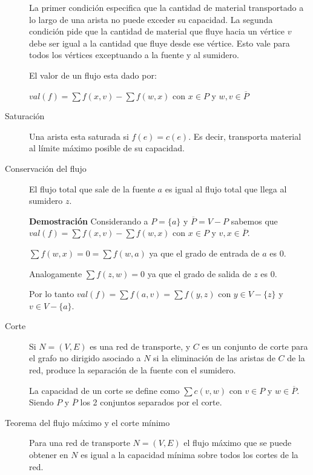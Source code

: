 \documentclass[a4paper, twoside]{article}
\begin{document}
\begin{description}
        La primer condición especifica que la cantidad de material transportado
        a lo largo de una arista no puede exceder su capacidad. La segunda condición
        pide que la cantidad de material que fluye hacia un vértice $v$ debe ser igual
        a la cantidad que fluye desde ese vértice. Esto vale para todos los vértices
        exceptuando a la fuente y al sumidero.

        El valor de un flujo esta dado por:

        $val(f) = \sum f(x,v) - \sum f(w,x)$ con $x \in P$ y $w,v \in \overline{P}$

        \item[Saturación] Una arista esta saturada si $f(e) = c(e)$. Es decir, 
        transporta material al límite máximo posible de su capacidad.

        \item[Conservación del flujo] El flujo total que sale de la fuente $a$ es
        igual al flujo total que llega al sumidero $z$.

        \textbf{Demostración} Considerando a $P = \{a\}$ y $\overline{P} = V - P$
        sabemos que $val(f) = \sum f(x,v) - \sum f(w,x)$ con $x \in P$ y $v,x \in \overline{P}$.
        
        $ \sum f(w,x) = 0 = \sum f(w,a)$ ya que el grado de entrada de $a$ es 0.

        Analogamente $ \sum f(z,w) = 0$ ya que el grado de salida de $z$ es 0.

        Por lo tanto $val(f) = \sum f(a,v) = \sum f(y,z)$ con $y \in V - \{z\}$ y $v \in V - \{a\}$. 

        \item[Corte] Si $N = (V,E)$ es una red de transporte, y $C$ es un conjunto de
        corte para el grafo no dirigido asociado a $N$ si la eliminación de las aristas
        de $C$ de la red, produce la separación de la fuente con el sumidero.

        La capacidad de un corte se define como $\sum c(v,w)$ con $v \in P$ y $w \in \overline{P}$.
        Siendo $P$ y $\overline{P}$ los 2 conjuntos separados por el corte.

        \item[Teorema del flujo máximo y el corte mínimo] Para una red de transporte $N = (V,E)$
        el flujo máximo que se puede obtener en $N$ es igual a la capacidad mínima sobre todos
        los cortes de la red.
\end{description}
\end{document}
